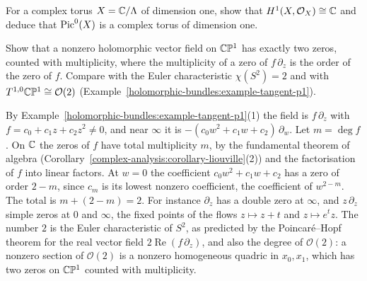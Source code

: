 \begin{exercise}\label{holomorphic-bundles:exercise-picard-torus}
For a complex torus $X = \mathbb{C}/\Lambda$ of dimension one, show that $H^1(X, \mathcal{O}_X) \cong \mathbb{C}$ and deduce that $\operatorname{Pic}^0(X)$ is a complex torus of dimension one.
\end{exercise}

\begin{exercise}\label{holomorphic-bundles:exercise-zeros-vector-field}
Show that a nonzero holomorphic vector field on $\mathbb{C}\mathbb{P}^1$ has exactly two zeros, counted with multiplicity, where the multiplicity of a zero of $f\,\partial_z$ is the order of the zero of $f$. Compare with the Euler
characteristic $\chi(S^2) = 2$ and with $T^{1,0}\mathbb{C}\mathbb{P}^1 \cong \mathcal{O}(2)$ (Example~\ref{holomorphic-bundles:example-tangent-p1}).
\end{exercise}

\begin{solution}
By Example~\ref{holomorphic-bundles:example-tangent-p1}(1) the field is $f\,\partial_z$ with $f = c_0 + c_1z + c_2z^2 \neq 0$, and near $\infty$ it is $-(c_0w^2 + c_1w + c_2)\,\partial_w$. Let $m = \deg f$. On $\mathbb{C}$ the zeros of $f$
have total multiplicity $m$, by the fundamental theorem of algebra (Corollary~\ref{complex-analysis:corollary-liouville}(2)) and the factorisation of $f$ into linear factors. At $w = 0$ the coefficient
$c_0w^2 + c_1w + c_2$ has a zero of order $2 - m$, since $c_m$ is its lowest nonzero coefficient, the coefficient of $w^{2-m}$. The total is $m + (2 - m) = 2$. For instance $\partial_z$ has a double zero at $\infty$, and
$z\,\partial_z$ simple zeros at $0$ and $\infty$, the fixed points of the flows $z \mapsto z + t$ and $z \mapsto e^tz$. The number $2$ is the Euler characteristic of $S^2$, as predicted by the Poincar\'e--Hopf theorem
for the real vector field $2\operatorname{Re}(f\,\partial_z)$, and also the degree of $\mathcal{O}(2)$: a nonzero section of $\mathcal{O}(2)$ is a nonzero homogeneous quadric in $x_0, x_1$, which has two zeros on
$\mathbb{C}\mathbb{P}^1$ counted with multiplicity.
\end{solution}

